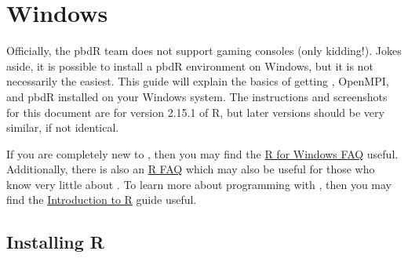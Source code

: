 \section{Windows}

Officially, the pbdR team does not support gaming consoles (only kidding!).  Jokes aside, it is possible to install a pbdR environment on Windows, but it is not necessarily the easiest.  This guide will explain the basics of getting , OpenMPI, and pbdR installed on your Windows system.  The instructions and screenshots for this document are for version 2.15.1 of R, but later versions should be very similar, if not identical.

If you are completely new to , then you may find the \href{http://cran.r-project.org/bin/windows/base/rw-FAQ.html}{R for Windows FAQ} useful.  Additionally, there is also an \href{http://cran.r-project.org/doc/FAQ/R-FAQ.html}{R FAQ} which may also be useful for those who know very little about .  To learn more about programming with , then you may find the \href{http://cran.us.r-project.org/doc/manuals/R-intro.html}{Introduction to R} guide useful.


\subsection{Installing R}


